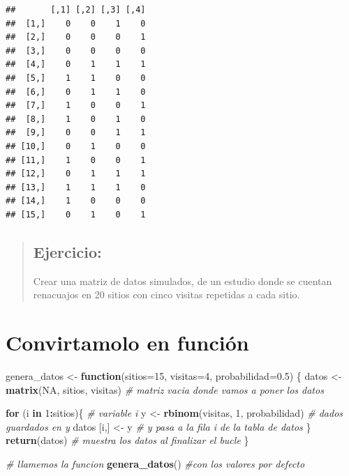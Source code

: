 \documentclass[
]{book}
\newenvironment{Shaded}{\begin{snugshade}}{\end{snugshade}}
\newcommand{\CommentTok}[1]{\textcolor[rgb]{0.56,0.35,0.01}{\textit{#1}}}
\newcommand{\ControlFlowTok}[1]{\textcolor[rgb]{0.13,0.29,0.53}{\textbf{#1}}}
\newcommand{\DataTypeTok}[1]{\textcolor[rgb]{0.13,0.29,0.53}{#1}}
\newcommand{\DecValTok}[1]{\textcolor[rgb]{0.00,0.00,0.81}{#1}}
\newcommand{\FloatTok}[1]{\textcolor[rgb]{0.00,0.00,0.81}{#1}}
\newcommand{\KeywordTok}[1]{\textcolor[rgb]{0.13,0.29,0.53}{\textbf{#1}}}
\newcommand{\NormalTok}[1]{#1}
\newcommand{\OperatorTok}[1]{\textcolor[rgb]{0.81,0.36,0.00}{\textbf{#1}}}
\newcommand{\OtherTok}[1]{\textcolor[rgb]{0.56,0.35,0.01}{#1}}
\newcommand{\StringTok}[1]{\textcolor[rgb]{0.31,0.60,0.02}{#1}}
\begin{document}
\begin{verbatim}
##       [,1] [,2] [,3] [,4]
##  [1,]    0    0    1    0
##  [2,]    0    0    0    1
##  [3,]    0    0    0    0
##  [4,]    0    1    1    1
##  [5,]    1    1    0    0
##  [6,]    0    1    1    0
##  [7,]    1    0    0    1
##  [8,]    1    0    1    0
##  [9,]    0    0    1    1
## [10,]    0    1    0    0
## [11,]    1    0    0    1
## [12,]    0    1    1    1
## [13,]    1    1    1    0
## [14,]    1    0    0    0
## [15,]    0    1    0    1
\end{verbatim}

\begin{quote}
\hypertarget{ejercicio-1}{%
\subsection{Ejercicio:}\label{ejercicio-1}}

Crear una matriz de datos simulados, de un estudio donde se cuentan renacuajos en 20 sitios con cinco visitas repetidas a cada sitio.
\end{quote}

\hypertarget{convirtamolo-en-funciuxf3n}{%
\section{Convirtamolo en función}\label{convirtamolo-en-funciuxf3n}}

\begin{Shaded}
\begin{Highlighting}[]
\NormalTok{genera_datos <-}\StringTok{ }\ControlFlowTok{function}\NormalTok{(}\DataTypeTok{sitios=}\DecValTok{15}\NormalTok{, }\DataTypeTok{visitas=}\DecValTok{4}\NormalTok{, }\DataTypeTok{probabilidad=}\FloatTok{0.5}\NormalTok{) \{}
\NormalTok{  datos <-}\StringTok{ }\KeywordTok{matrix}\NormalTok{(}\OtherTok{NA}\NormalTok{, sitios, visitas) }\CommentTok{# matriz vacia donde vamos a poner los datos}
  
  \ControlFlowTok{for}\NormalTok{ (i }\ControlFlowTok{in} \DecValTok{1}\OperatorTok{:}\NormalTok{sitios)\{     }\CommentTok{# variable i }
\NormalTok{    y <-}\StringTok{ }\KeywordTok{rbinom}\NormalTok{(visitas, }\DecValTok{1}\NormalTok{, probabilidad) }\CommentTok{# dados guardados en y}
\NormalTok{    datos [i,] <-}\StringTok{ }\NormalTok{y       }\CommentTok{# y pasa a la fila i de la tabla de datos}
\NormalTok{  \}  }
  \KeywordTok{return}\NormalTok{(datos) }\CommentTok{# muestra los datos al finalizar el bucle}
\NormalTok{\}                  }


\CommentTok{# llamemos la funcion }
\KeywordTok{genera_datos}\NormalTok{() }\CommentTok{#con los valores por defecto}
\end{Highlighting}
\end{Shaded}
\end{document}

